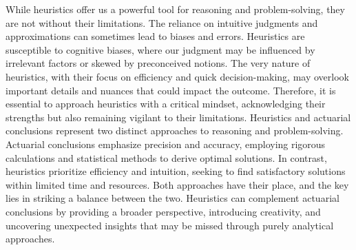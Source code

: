 \documentclass[ebook,12pt,oneside,openany]{memoir}
\begin{document}
While heuristics offer us a powerful tool for reasoning and problem-solving, they are not without their limitations. The reliance on intuitive judgments and approximations can sometimes lead to biases and errors. Heuristics are susceptible to cognitive biases, where our judgment may be influenced by irrelevant factors or skewed by preconceived notions. The very nature of heuristics, with their focus on efficiency and quick decision-making, may overlook important details and nuances that could impact the outcome. Therefore, it is essential to approach heuristics with a critical mindset, acknowledging their strengths but also remaining vigilant to their limitations.
Heuristics and actuarial conclusions represent two distinct approaches to reasoning and problem-solving. Actuarial conclusions emphasize precision and accuracy, employing rigorous calculations and statistical methods to derive optimal solutions. In contrast, heuristics prioritize efficiency and intuition, seeking to find satisfactory solutions within limited time and resources. Both approaches have their place, and the key lies in striking a balance between the two. Heuristics can complement actuarial conclusions by providing a broader perspective, introducing creativity, and uncovering unexpected insights that may be missed through purely analytical approaches.
\end{document}
